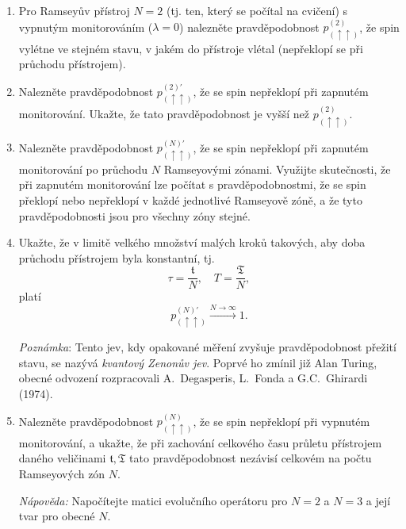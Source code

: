 \documentclass[a4paper,11pt,twoside]{book}
\begin{document}
    \begin{enumerate}
    \item
        Pro Ramseyův přístroj $N=2$ (tj. ten, který se počítal na cvičení) s vypnutým monitorováním ($\lambda=0$) nalezněte pravděpodobnost 
        $p^{(2)}_{(\uparrow\uparrow)}$, že spin vylétne ve stejném stavu, v jakém do přístroje vlétal (nepřeklopí se při průchodu přístrojem).
    
    \item
        Nalezněte pravděpodobnost $p^{(2)'}_{(\uparrow\uparrow)}$, že se spin nepřeklopí při zapnutém monitorování.
        Ukažte, že tato pravděpodobnost je vyšší než $p^{(2)}_{(\uparrow\uparrow)}$.
        
    \item
        Nalezněte pravděpodobnost $p^{(N)'}_{(\uparrow\uparrow)}$, že se spin nepřeklopí při zapnutém monitorování po
        průchodu $N$ Ramseyovými zónami.
        Využijte skutečnosti, že při zapnutém monitorování lze počítat s pravděpodobnostmi, že se spin překlopí nebo nepřeklopí v každé jednotlivé Ramseyově zóně, a že tyto pravděpodobnosti jsou pro všechny zóny stejné.

    \item
        Ukažte, že v limitě velkého množství malých kroků takových, aby doba průchodu přístrojem byla konstantní, tj. 
        \begin{equation*}
            \tau=\frac{\mathfrak{t}}{N},\quad T=\frac{\mathfrak{T}}{N},
        \end{equation*}
        platí 
        \begin{equation*}
            p^{(N)'}_{(\uparrow\uparrow)}\xrightarrow{N\rightarrow\infty}1.
        \end{equation*} 

        \emph{Poznámka}:
        Tento jev, kdy opakované měření zvyšuje pravděpodobnost přežití stavu, se nazývá \emph{kvantový Zenonův jev}.
        Poprvé ho zmínil již Alan Turing, obecné odvození rozpracovali A.~Degasperis, L.~Fonda a G.C.~Ghirardi (1974).%
    
    \item
        Nalezněte pravděpodobnost $p^{(N)}_{(\uparrow\uparrow)}$, že se spin nepřeklopí při vypnutém monitorování, a ukažte, že při zachování celkového času průletu přístrojem daného veličinami $\mathfrak{t},\mathfrak{T}$  tato pravděpodobnost nezávisí celkovém na počtu Ramseyových zón $N$.

        \emph{Nápověda:} Napočítejte matici evolučního operátoru pro $N=2$ a $N=3$ a  její tvar pro obecné $N$.
    \end{enumerate}
\end{document}
